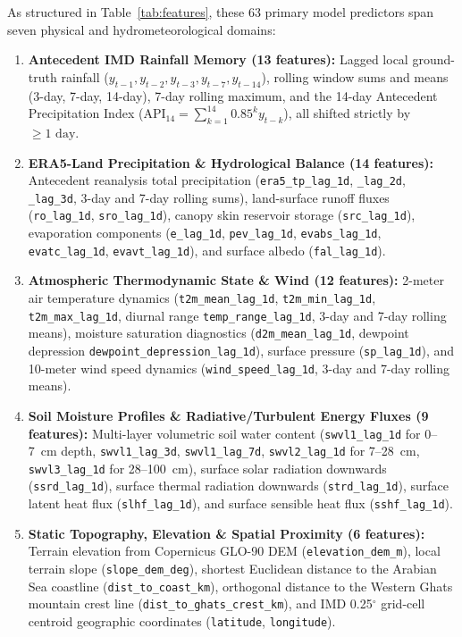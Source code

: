 \documentclass[pdflatex,sn-mathphys,Numbered]{sn-jnl}
\begin{document}
As structured in Table~\ref{tab:features}, these 63 primary model predictors span seven physical and hydrometeorological domains:
\begin{enumerate}
    \item \textbf{Antecedent IMD Rainfall Memory (13 features):} Lagged local ground-truth rainfall ($y_{t-1}, y_{t-2}, y_{t-3}, y_{t-7}, y_{t-14}$), rolling window sums and means (3-day, 7-day, 14-day), 7-day rolling maximum, and the 14-day Antecedent Precipitation Index ($\text{API}_{14} = \sum_{k=1}^{14} 0.85^k y_{t-k}$), all shifted strictly by $\ge 1\text{ day}$.
    \item \textbf{ERA5-Land Precipitation \& Hydrological Balance (14 features):} Antecedent reanalysis total precipitation (\texttt{era5\_tp\_lag\_1d}, \texttt{\_lag\_2d}, \texttt{\_lag\_3d}, 3-day and 7-day rolling sums), land-surface runoff fluxes (\texttt{ro\_lag\_1d}, \texttt{sro\_lag\_1d}), canopy skin reservoir storage (\texttt{src\_lag\_1d}), evaporation components (\texttt{e\_lag\_1d}, \texttt{pev\_lag\_1d}, \texttt{evabs\_lag\_1d}, \texttt{evatc\_lag\_1d}, \texttt{evavt\_lag\_1d}), and surface albedo (\texttt{fal\_lag\_1d}).
    \item \textbf{Atmospheric Thermodynamic State \& Wind (12 features):} 2-meter air temperature dynamics (\texttt{t2m\_mean\_lag\_1d}, \texttt{t2m\_min\_lag\_1d}, \texttt{t2m\_max\_lag\_1d}, diurnal range \texttt{temp\_range\_lag\_1d}, 3-day and 7-day rolling means), moisture saturation diagnostics (\texttt{d2m\_mean\_lag\_1d}, dewpoint depression \texttt{dewpoint\_depression\_lag\_1d}), surface pressure (\texttt{sp\_lag\_1d}), and 10-meter wind speed dynamics (\texttt{wind\_speed\_lag\_1d}, 3-day and 7-day rolling means).
    \item \textbf{Soil Moisture Profiles \& Radiative/Turbulent Energy Fluxes (9 features):} Multi-layer volumetric soil water content (\texttt{swvl1\_lag\_1d} for 0--7~cm depth, \texttt{swvl1\_lag\_3d}, \texttt{swvl1\_lag\_7d}, \texttt{swvl2\_lag\_1d} for 7--28~cm, \texttt{swvl3\_lag\_1d} for 28--100~cm), surface solar radiation downwards (\texttt{ssrd\_lag\_1d}), surface thermal radiation downwards (\texttt{strd\_lag\_1d}), surface latent heat flux (\texttt{slhf\_lag\_1d}), and surface sensible heat flux (\texttt{sshf\_lag\_1d}).
    \item \textbf{Static Topography, Elevation \& Spatial Proximity (6 features):} Terrain elevation from Copernicus GLO-90 DEM (\texttt{elevation\_dem\_m}), local terrain slope (\texttt{slope\_dem\_deg}), shortest Euclidean distance to the Arabian Sea coastline (\texttt{dist\_to\_coast\_km}), orthogonal distance to the Western Ghats mountain crest line (\texttt{dist\_to\_ghats\_crest\_km}), and IMD 0.25$^\circ$ grid-cell centroid geographic coordinates (\texttt{latitude}, \texttt{longitude}).

\end{enumerate}
\end{document}
